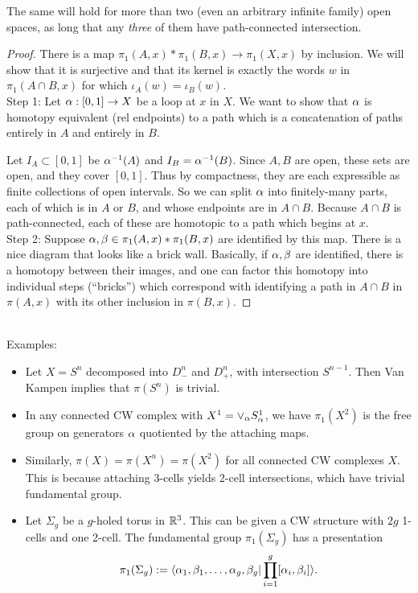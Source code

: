 \documentclass{amsart}
\begin{document}
	 The same will hold for more than two (even an arbitrary infinite family) open spaces, as long that any \textit{three} of them have path-connected intersection.
	 \begin{proof}
	 	There is a map $\pi_1(A,x)\ast \pi_1(B,x)\to \pi_1(X,x)$ by inclusion. We will show that it is surjective and that its kernel is exactly the words $w$ in $\pi_1(A\cap B,x)$ for which $\iota_A(w)=\iota_B(w)$.\\
	 	
	 	Step 1: Let $\alpha:[0,1]\to X$ be a loop at $x$ in $X$. We want to show that $\alpha$ is homotopy equivalent (rel endpoints) to a path which is a concatenation of paths entirely in $A$ and entirely in $B$. 
	 	
	 	Let $I_A\subset [0,1]$ be $\alpha^{-1}(A)$ and $I_B=\alpha^{-1}(B)$. Since $A,B$ are open, these sets are open, and they cover $[0,1]$. Thus by compactness, they are each expressible as finite collections of open intervals. So we can split $\alpha$ into finitely-many parts, each of which is in $A$ or $B$, and whose endpoints are in $A\cap B$. Because $A\cap B$ is path-connected, each of these are homotopic to a path which begins at $x$.\\
	 	
	 	Step 2: Suppose $\alpha,\beta\in \pi_1(A,x)\ast \pi_1(B,x)$ are identified by this map. There is a nice diagram that looks like a brick wall. Basically, if $\alpha,\beta$ are identified, there is a homotopy between their images, and one can factor this homotopy into individual steps (``bricks'') which correspond with identifying a path in $A\cap B$ in $\pi(A,x)$ with its other inclusion in $\pi(B,x)$.  
	 \end{proof}\\
	 
	 Examples:
	 \begin{itemize}
	 	\item Let $X=S^n$ decomposed into $D^n_-$ and $D^n_+$, with intersection $S^{n-1}$. Then Van Kampen implies that $\pi(S^n)$ is trivial.
	 	\item In any connected CW complex with $X^1=\vee_{\alpha} S^1_{\alpha}$, we have $\pi_1(X^2)$ is the free group on generators $\alpha$ quotiented by the attaching maps.
	 	\item Similarly, $\pi(X)=\pi(X^n)=\pi(X^2)$ for all connected CW complexes $X$. This is because attaching 3-cells yields 2-cell intersections, which have trivial fundamental group.
	 	\item Let $\Sigma_g$ be a $g$-holed torus in $\mathbb{R}^3$. This can be given a CW structure with $2g$ 1-cells and one 2-cell. The fundamental group $\pi_1(\Sigma_g)$ has a presentation 
	 	$$
	 	\pi_1(\Sigma_g) := \langle\alpha_1,\beta_1,\dots,\alpha_g,\beta_g | \prod_{i=1}^g [\alpha_i,\beta_i]\rangle.
	 	$$
	 \end{itemize}
	 \medskip
	 
\end{document}
